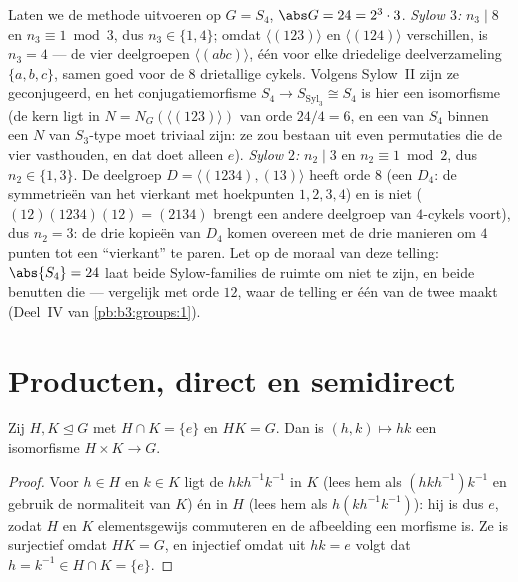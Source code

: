 \begin{example}
\label{ex:b3:groups:s4sylow}
Laten we de methode uitvoeren op $G = S_4$, $\abs G = 24 =
2^3\cdot3$. \emph{Sylow $3$:} $n_3 \mid 8$ en $n_3 \equiv 1 \bmod
3$, dus $n_3 \in \{1, 4\}$; omdat $\langle(123)\rangle$ en
$\langle(124)\rangle$ verschillen, is $n_3 = 4$ --- de vier
deelgroepen $\langle(abc)\rangle$, één voor elke driedelige
deelverzameling $\{a, b, c\}$, samen goed voor de $8$ drietallige
cykels. Volgens Sylow~II zijn ze geconjugeerd, en het
conjugatiemorfisme $S_4 \to S_{\mathrm{Syl}_3} \cong S_4$ is hier
een isomorfisme (de kern ligt in $N = N_G(\langle(123)\rangle)$ van
orde $24/4 = 6$, en een  van $S_4$ binnen een $N$ van
$S_3$-type moet triviaal zijn: ze zou bestaan uit even permutaties
die de vier  vasthouden, en dat doet alleen $e$).
\emph{Sylow $2$:} $n_2 \mid 3$ en $n_2 \equiv 1 \bmod 2$, dus $n_2
\in \{1, 3\}$. De deelgroep $D = \langle(1234), (13)\rangle$ heeft
orde $8$ (een  $D_4$: de symmetrieën van het vierkant
met hoekpunten $1, 2, 3, 4$) en is niet  ($(12)(1234)(12) =
(2134)$ brengt een andere deelgroep van $4$-cykels voort), dus $n_2
= 3$: de drie kopieën van $D_4$ komen overeen met de drie manieren
om $4$ punten tot een ``vierkant'' te paren. Let op de moraal van
deze telling: $\abs{S_4} = 24$ laat beide Sylow-families de ruimte
om niet  te zijn, en beide benutten die --- vergelijk met
orde $12$, waar de telling er één van de twee  maakt
(Deel~IV van \cref{pb:b3:groups:1}).
\end{example}

\section{Producten, direct en semidirect}

\begin{proposition}\label{prop:b3:groups:direct}
Zij $H, K \trianglelefteq G$ met $H \cap K = \{e\}$ en $HK = G$.
Dan is $(h,k) \mapsto hk$ een isomorfisme $H \times K \to
G$.
\end{proposition}

\begin{proof}
Voor $h \in H$ en $k \in K$ ligt de  $hkh^{-1}k^{-1}$ in
$K$ (lees hem als $(hkh^{-1})k^{-1}$ en gebruik de normaliteit van
$K$) én in $H$ (lees hem als $h(kh^{-1}k^{-1})$): hij is dus $e$,
zodat $H$ en $K$ elementsgewijs commuteren en de afbeelding een
morfisme is. Ze is surjectief omdat $HK = G$, en injectief omdat
uit $hk = e$ volgt dat $h = k^{-1} \in H \cap K = \{e\}$.
\end{proof}


